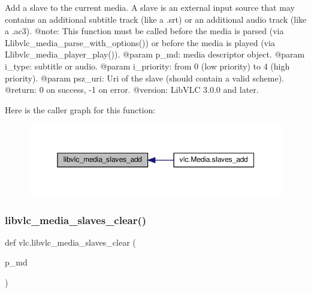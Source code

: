 \begin{DoxyVerb}Add a slave to the current media.
A slave is an external input source that may contains an additional subtitle
track (like a .srt) or an additional audio track (like a .ac3).
@note: This function must be called before the media is parsed (via
L{libvlc_media_parse_with_options}()) or before the media is played (via
L{libvlc_media_player_play}()).
@param p_md: media descriptor object.
@param i_type: subtitle or audio.
@param i_priority: from 0 (low priority) to 4 (high priority).
@param psz_uri: Uri of the slave (should contain a valid scheme).
@return: 0 on success, -1 on error.
@version: LibVLC 3.0.0 and later.
\end{DoxyVerb}
 Here is the caller graph for this function\+:
\nopagebreak
\begin{figure}[H]
\begin{center}
\leavevmode
\includegraphics[width=350pt]{namespacevlc_a1982967514b4a8cb9ac19f3edbdc4702_icgraph}
\end{center}
\end{figure}
\mbox{\label{namespacevlc_ad3b2622646a9b47d26c66d7ba9ba8759}} 
\subsubsection{\texorpdfstring{libvlc\+\_\+media\+\_\+slaves\+\_\+clear()}{libvlc\_media\_slaves\_clear()}}
{\footnotesize\ttfamily def vlc.\+libvlc\+\_\+media\+\_\+slaves\+\_\+clear (\begin{DoxyParamCaption}\item[{}]{p\+\_\+md }\end{DoxyParamCaption})}

